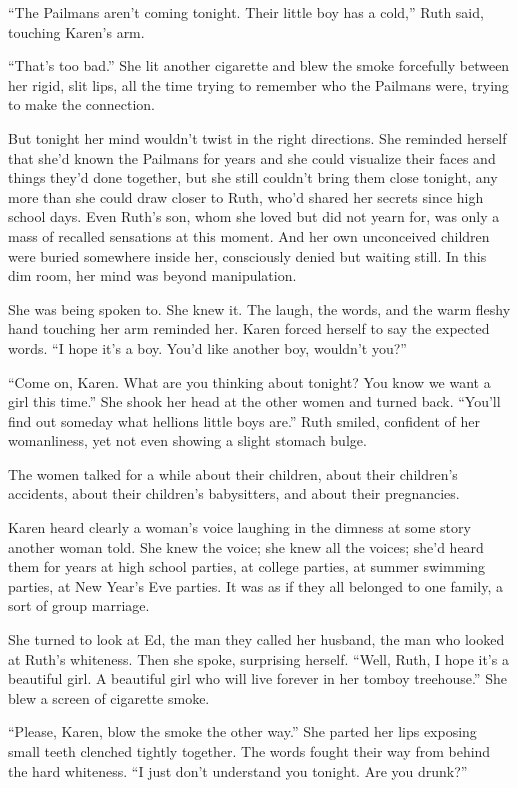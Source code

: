 \documentclass[
]{article}
\begin{document}
``The Pailmans aren't coming tonight. Their little boy has a cold,''
Ruth said, touching Karen's arm.

``That's too bad.'' She lit another cigarette and blew the smoke
forcefully between her rigid, slit lips, all the time trying to remember
who the Pailmans were, trying to make the connection.

But tonight her mind wouldn't twist in the right directions. She
reminded herself that she'd known the Pailmans for years and she could
visualize their faces and things they'd done together, but she still
couldn't bring them close tonight, any more than she could draw closer
to Ruth, who'd shared her secrets since high school days. Even Ruth's
son, whom she loved but did not yearn for, was only a mass of recalled
sensations at this moment. And her own unconceived children were buried
some­where inside her, consciously denied but waiting still. In this dim
room, her mind was beyond manipulation.

She was being spoken to. She knew it. The laugh, the words, and the warm
fleshy hand touch­ing her arm reminded her. Karen forced herself to say
the expected words. ``I hope it's a boy. You'd like another boy,
wouldn't you?''

``Come on, Karen. What are you thinking about tonight? You know we want
a girl this time.'' She shook her head at the other women and turned
back. ``You'll find out someday what hellions little boys are.'' Ruth
smiled, confident of her womanliness, yet not even showing a slight
stomach bulge.

The women talked for a while about their children, about their
children's accidents, about their children's babysitters, and about
their pregnancies.

Karen heard clearly a woman's voice laughing in the dimness at some
story another woman told. She knew the voice; she knew all the voices;
she'd heard them for years at high school parties, at college parties,
at summer swimming parties, at New Year's Eve parties. It was as if they
all belonged to one family, a sort of group marriage.

She turned to look at Ed, the man they called her husband, the man who
looked at Ruth's whiteness. Then she spoke, surprising herself. ``Well,
Ruth, I hope it's a beautiful girl. A beautiful girl who will live
forever in her tomboy treehouse.'' She blew a screen of cigarette smoke.

``Please, Karen, blow the smoke the other way.'' She parted her lips
exposing small teeth clenched tightly together. The words fought their
way from behind the hard whiteness. ``I just don't understand you
tonight. Are you drunk?''
\end{document}

